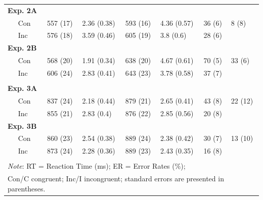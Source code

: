 \documentclass[]{DissertateCUNY}
\begin{document}
\begin{table}[htpb]
{\begin{tabular}{rrcccccc}
&       &       &       &       &       &       &  \\
\midrule
\multicolumn{2}{l}{\textbf{Exp. 2A}}  &   &    &     &     &    &  \\
& \multicolumn{1}{l}{Con} & \multicolumn{1}{l}{557 (17)} & \multicolumn{1}{l}{2.36 (0.38)} & \multicolumn{1}{l}{593 (16)} & \multicolumn{1}{l}{4.36 (0.57)} & \multicolumn{1}{l}{36 (6)} & \multicolumn{1}{l}{8 (8)} \\
& \multicolumn{1}{l}{Inc} & \multicolumn{1}{l}{576 (18)} & \multicolumn{1}{l}{3.59 (0.46)} & \multicolumn{1}{l}{605 (19)} & \multicolumn{1}{l}{3.8 (0.6)} & \multicolumn{1}{l}{28 (6)} & \multicolumn{1}{l}{ } \\
\multicolumn{2}{l}{\textbf{Exp. 2B}} &    &     &     &     &     &  \\
& \multicolumn{1}{l}{Con} & \multicolumn{1}{l}{568 (20)} & \multicolumn{1}{l}{1.91 (0.34)} & \multicolumn{1}{l}{638 (20)} & \multicolumn{1}{l}{4.67 (0.61)} & \multicolumn{1}{l}{70 (5)} & \multicolumn{1}{l}{33 (6)} \\
& \multicolumn{1}{l}{Inc} & \multicolumn{1}{l}{606 (24)} & \multicolumn{1}{l}{2.83 (0.41)} & \multicolumn{1}{l}{643 (23)} & \multicolumn{1}{l}{3.78 (0.58)} & \multicolumn{1}{l}{37 (7)} & \multicolumn{1}{l}{ } \\
&       &       &       &       &       &       &  \\
\midrule
\multicolumn{2}{l}{\textbf{Exp. 3A}}  &   &    &     &     &    &  \\
& \multicolumn{1}{l}{Con} & \multicolumn{1}{l}{837 (24)} & \multicolumn{1}{l}{2.18 (0.44)} & \multicolumn{1}{l}{879 (21)} & \multicolumn{1}{l}{2.65 (0.41)} & \multicolumn{1}{l}{43 (8)} & \multicolumn{1}{l}{22 (12)} \\
& \multicolumn{1}{l}{Inc} & \multicolumn{1}{l}{855 (21)} & \multicolumn{1}{l}{2.83 (0.4)} & \multicolumn{1}{l}{876 (22)} & \multicolumn{1}{l}{2.85 (0.56)} & \multicolumn{1}{l}{20 (8)} & \multicolumn{1}{l}{ } \\
\multicolumn{2}{l}{\textbf{Exp. 3B}} &    &     &     &     &     &  \\
& \multicolumn{1}{l}{Con} & \multicolumn{1}{l}{860 (23)} & \multicolumn{1}{l}{2.54 (0.38)} & \multicolumn{1}{l}{889 (24)} & \multicolumn{1}{l}{2.38 (0.42)} & \multicolumn{1}{l}{30 (7)} & \multicolumn{1}{l}{13 (10)} \\
& \multicolumn{1}{l}{Inc} & \multicolumn{1}{l}{873 (24)} & \multicolumn{1}{l}{2.28 (0.36)} & \multicolumn{1}{l}{889 (23)} & \multicolumn{1}{l}{2.43 (0.35)} & \multicolumn{1}{l}{16 (8)} & \multicolumn{1}{l}{ } \\
&       &       &       &       &       &       &  \\
\bottomrule
\multicolumn{8}{l}{\textit{Note}: RT = Reaction Time (ms);  ER = Error Rates (\%);  } \\
\multicolumn{8}{l}{Con/C  congruent; Inc/I  incongruent; standard errors are presented in parentheses.} \\
\end{tabular}
}%
\end{table}
\end{document}
